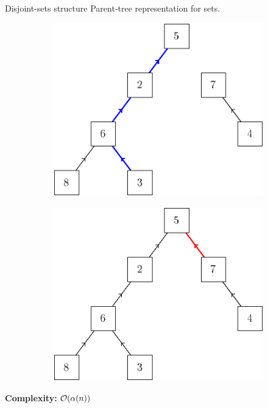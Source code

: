 \begin{frame}{Disjoint-sets structure}
	Parent-tree representation for sets.
	\begin{figure}
		\centering%
		\begin{subfigure}{0.45\textwidth}
			\includegraphics[width=\linewidth]{ds/disjoint_find}
		\end{subfigure}%
		\hspace{0.045\textwidth}%
		\vline%
		\hspace{0.045\textwidth}%
		\begin{subfigure}{0.45\textwidth}
			\includegraphics[width=\linewidth]{ds/disjoint_link}
		\end{subfigure}%
	\end{figure}
	\pause
	\textbf{Complexity: } $\mathcal{O}(\alpha(n))$ 
\end{frame}
